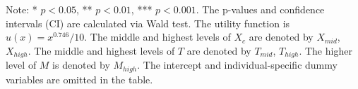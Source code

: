 \documentclass[12pt]{article}
\begin{document}
\begin{table}
	
	\vspace*{4pt}
    \centering
    \begin{minipage}{1.2\textwidth}
    {\par\footnotesize Note: * $p<0.05$, ** $p<0.01$, *** $p<0.001$. The p-values and confidence intervals (CI) are calculated via Wald test. The utility function is $u(x)=x^{0.746}/10$. The middle and highest levels of $X_c$ are denoted by $X_{mid}$, $X_{high}$. The middle and highest levels of $T$ are denoted by $T_{mid}$, $T_{high}$. The higher level of $M$ is denoted by $M_{high}$. The intercept and individual-specific dummy variables are omitted in the table.}
    \end{minipage}
    \label{tab:utility-immed}
\end{table}
\end{document}
